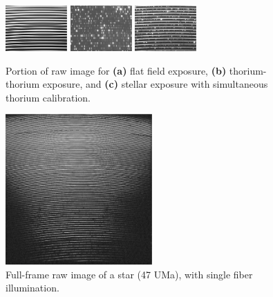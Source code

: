 \documentclass[12pt,preprint]{emulateapj}
\begin{document}
\begin{figure}[htbp] %
   \centering
   \includegraphics[width=0.21\textwidth, angle=90]{flat.eps} 
   \includegraphics[width=0.21\textwidth, angle=90]{thar-thar2.eps} 
   \includegraphics[width=0.21\textwidth, angle=90]{star-thar.eps} 
    \caption{Portion of raw image for {\bf (a)} flat field exposure, {\bf (b)} 
    thorium-thorium exposure, and {\bf (c)} stellar exposure with simultaneous
    thorium calibration.}
   \label{fig:frames}
\end{figure}

\begin{figure}[htbp] %
   \centering
      \includegraphics[width=0.5\textwidth]{full_star.eps}
    \caption{Full-frame raw image of a star (47 UMa), with single fiber illumination.}
    \vspace{10pt}
   \label{fig:fullstar}
\end{figure}
\end{document}
